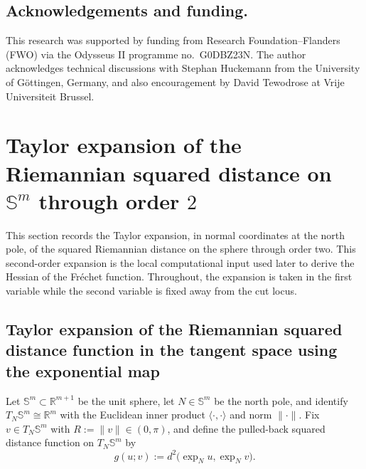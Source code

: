 \documentclass{amsart}
\theoremstyle{definition}
\theoremstyle{remark}
\newcommand\0{\boldsymbol{0}}
\begin{document}
\subsection{{Acknowledgements and funding.}}

This research was supported by funding from Research Foundation--Flanders (FWO) via the Odysseus II programme no.~G0DBZ23N. The author acknowledges technical discussions with Stephan Huckemann from the University of G\"ottingen, Germany, and also encouragement by David Tewodrose at Vrije Universiteit Brussel.

\section{Taylor expansion of the Riemannian squared distance on $\mathbb{S}^m$ through order $2$}
\label{scn:TE-sqdist}

This section records the Taylor expansion, in normal coordinates at the north pole, of the squared Riemannian distance on the sphere through order two.  This second-order expansion is the local computational input used later to derive the Hessian of the Fr\'echet function.  Throughout, the expansion is taken in the first variable while the second variable is fixed away from the cut locus.

\subsection{Taylor expansion of the Riemannian squared distance function in the tangent space using the exponential map}

Let $\mathbb{S}^{m}\subset\mathbb{R}^{m+1}$ be the unit sphere, let $N\in\mathbb{S}^{m}$ be the north pole, and identify $T_{N}\mathbb{S}^{m}\cong\mathbb{R}^{m}$ with the Euclidean inner product $\langle\cdot,\cdot\rangle$ and norm $\|\cdot\|$.  Fix $v\in T_{N}\mathbb{S}^{m}$ with \(R:=\|v\|\in(0,\pi)\), and define the pulled-back squared distance function on \(T_N\mathbb S^m\) by
\begin{equation}\label{eqn:pulled-back-sq-dist}
   g(u;v):=d^{2}\big(\exp_{N}u,\exp_{N}v\big).
\end{equation}
\end{document}
